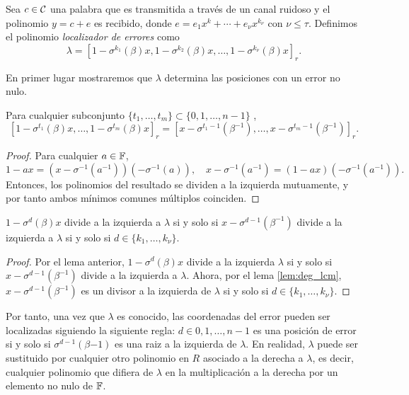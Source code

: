 Sea \(c \in \mathcal{C}\) una palabra que es transmitida a través de un canal ruidoso y el polinomio \(y = c + e\) es recibido, donde \(e = e_1 x^k + \cdots + e_\nu x^{k_\nu}\) con \(\nu \leq \tau\). Definimos el polinomio \textit{localizador de errores} como
\[
\lambda = {\left[1 - \sigma^{k_1}(\beta)x, 1 - \sigma^{k_2}(\beta)x, \dots, 1 - \sigma^{k_\nu}(\beta)x\right]}_r
.\]

En primer lugar mostraremos que \(\lambda\) determina las posiciones con un error no nulo.

\begin{lemma}\label{lem:lamda_roots}
    Para cualquier subconjunto \(\{t_1, \dots, t_m\} \subset \{0, 1, \dots, n-1\}\) ,
    \[
    {\left[1 -\sigma^{t_1}(\beta)x, \dots, 1 - \sigma^{t_m}(\beta)x \right]}_r
    = {\left[x - \sigma^{t_1 - 1}(\beta^{-1}), \dots, x - \sigma^{t_m -1}(\beta^{-1})\right]}_r
    .\]
\end{lemma}

\begin{proof}
    Para cualquier \(a \in \mathbb{F}\),
    \[
    1 - ax = (x - \sigma^{-1}(a^{-1}))(- \sigma^{-1}(a)),\quad
    x - \sigma^{-1}(a^{-1}) = (1 - ax)(-\sigma^{-1}(a^{-1})).
    \]
    Entonces, los polinomios del resultado se dividen a la izquierda mutuamente, y por tanto ambos mínimos comunes múltiplos coinciden.
\end{proof}

\begin{proposition}
\label{prop:root_error_position}
    \(1- \sigma^d(\beta)x\) divide a la izquierda a \(\lambda\) si y solo si \(x - \sigma^{d-1}(\beta^{-1})\) divide a la izquierda a  \(\lambda\) si y solo si \(d \in \{k_1, \dots, k_\nu\}\).
\end{proposition}

\begin{proof}
    Por el lema anterior, \(1 - \sigma^d(\beta)x\) divide a la izquierda \(\lambda\) si y solo si  \(x - \sigma^{d-1}(\beta^{-1})\) divide a la izquierda a \(\lambda\). Ahora, por el lema \ref{lem:deg_lcm}, \(x - \sigma^{d-1}(\beta^{-1})\) es un divisor a la izquierda de \(\lambda\) si y solo si  \(d \in \{k_1, \dots, k_\nu\}\).
\end{proof}

Por tanto, una vez que \(\lambda\) es conocido, las coordenadas del error pueden ser localizadas siguiendo la siguiente regla: \(d \in {0,1, \dots, n-1}\) es una posición de error si y solo si \(\sigma^{d-1}(\beta{-1})\) es una raiz a la izquierda de \(\lambda\). En realidad,  \(\lambda\) puede ser sustituido por cualquier otro polinomio en \(R\) asociado a la derecha a \(\lambda\), es decir, cualquier polinomio que difiera de \(\lambda\) en la multiplicación a la derecha por un elemento no nulo de \(\mathbb{F}\).

